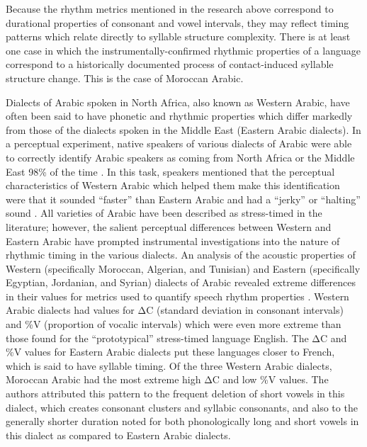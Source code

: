   Because the rhythm metrics mentioned in the research above correspond to durational properties of consonant and vowel intervals, they may reflect timing patterns which relate directly to syllable structure complexity. There is at least one case in which the instrumentally-confirmed rhythmic properties of a language correspond to a historically documented process of contact-induced syllable structure change. This is the case of Moroccan Arabic.

  Dialects of Arabic spoken in North Africa, also known as Western Arabic, have often been said to have phonetic and rhythmic properties which differ markedly from those of the dialects spoken in the Middle East (Eastern Arabic dialects). In a perceptual experiment, native speakers of various dialects of Arabic were able to correctly identify Arabic speakers as coming from North Africa or the Middle East 98\% of the time \citep{BarkatEtAl1999}. In this task, speakers mentioned that the perceptual characteristics of Western Arabic which helped them make this identification were that it sounded “faster” than Eastern Arabic and had a “jerky” or “halting” sound \citep{GhazaliEtAl2002}. All varieties of Arabic have been described as stress-timed in the literature; however, the salient perceptual differences between Western and Eastern Arabic have prompted instrumental investigations into the nature of rhythmic timing in the various dialects. An analysis of the acoustic properties of Western (specifically Moroccan, Algerian, and Tunisian) and Eastern (specifically Egyptian, Jordanian, and Syrian) dialects of Arabic revealed extreme differences in their values for metrics used to quantify speech rhythm properties \citep{HamdiEtAl2004}. Western Arabic dialects had values for ΔC (standard deviation in consonant intervals) and \%V (proportion of vocalic intervals) which were even more extreme than those found for the ``prototypical'' stress-timed language English. The ΔC and \%V values for Eastern Arabic dialects put these languages closer to French, which is said to have syllable timing. Of the three Western Arabic dialects, Moroccan Arabic had the most extreme high ΔC and low \%V values. The authors attributed this pattern to the frequent deletion of short vowels in this dialect, which creates consonant clusters and syllabic consonants, and also to the generally shorter duration noted for both phonologically long and short vowels in this dialect as compared to Eastern Arabic dialects.

